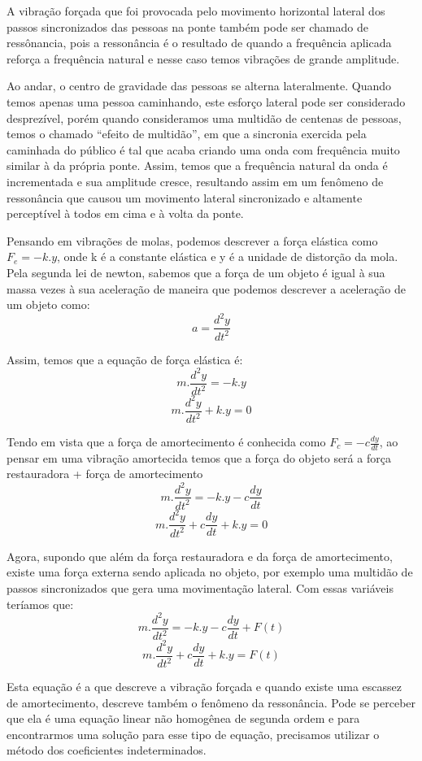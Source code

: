 \documentclass[]{article}
\begin{document}
A vibração forçada que foi provocada pelo movimento horizontal lateral dos passos sincronizados das pessoas na ponte também pode ser 
chamado de ressônancia, pois a ressonância  é o resultado de quando a frequência aplicada reforça a frequência natural e nesse caso temos vibrações de grande amplitude.

Ao andar, o centro de gravidade das pessoas se alterna lateralmente. 
Quando temos apenas uma pessoa caminhando, este esforço lateral pode ser considerado 
desprezível, porém quando consideramos uma multidão de centenas de pessoas, temos o 
chamado “efeito de multidão”, em que a sincronia exercida pela caminhada do público é tal 
que acaba criando uma onda com frequência muito similar à da própria ponte. Assim, 
temos que a frequência natural da onda é incrementada e sua amplitude cresce, 
resultando assim em um fenômeno de ressonância que causou um movimento lateral 
sincronizado e altamente perceptível à todos em cima e à volta da ponte.

Pensando em vibrações de molas, podemos descrever a força elástica como $F_e = -k.y$, onde k é a
constante elástica e y é a unidade de distorção da mola. Pela segunda lei de newton, sabemos que a força de um
objeto é igual à sua massa vezes à sua aceleração de maneira que podemos descrever a aceleração de um objeto como:
\[ a = \frac{d^2 y}{d t^2} \]

Assim, temos que a equação de força elástica é:
\[ m.\frac{d^2 y}{d t^2} = -k.y \]
\[ m.\frac{d^2 y}{d t^2} + k.y = 0\]

Tendo em vista que a força de amortecimento é conhecida como $F_c = -c\frac{dy}{dt}$,
ao pensar em uma vibração amortecida temos que a força do objeto será a 
força restauradora + força de amortecimento
\[ m.\frac{d^2 y}{d t^2} = -k.y - c\frac{dy}{dt}\]
\[ m.\frac{d^2 y}{d t^2} + c\frac{dy}{dt}  + k.y = 0\]

Agora, supondo que além da força restauradora e da força de amortecimento, existe uma força externa sendo aplicada no
objeto, por exemplo uma multidão de passos sincronizados que gera uma movimentação lateral.
Com essas variáveis teríamos que:
\[ m.\frac{d^2 y}{d t^2} = -k.y - c\frac{dy}{dt} + F(t)\] 
\[ m.\frac{d^2 y}{d t^2} + c\frac{dy}{dt}  + k.y = F(t)\] 

Esta equação é a que descreve a vibração forçada e quando existe uma escassez de amortecimento,
descreve também o fenômeno da ressonância.
Pode se perceber que ela é uma equação linear não homogênea de segunda ordem e para encontrarmos 
uma solução para esse tipo de equação, precisamos utilizar o método dos coeficientes indeterminados.
\end{document}
